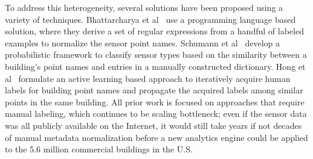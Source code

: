To address this heterogeneity, several solutions have been proposed using a variety of techniques.
Bhattarcharya et al~\cite{arka} use a programming language based solution,
where they derive a set of regular expressions from a handful of labeled examples
to normalize the sensor point names.
Schumann et al~\cite{ibm} develop a probabilistic framework to classify sensor types
based on the similarity between a building's point names and entries in a manually constructed dictionary.
Hong et al~\cite{cikm} formulate an active learning based approach to iteratively
acquire human labels for building point names and propagate the acquired labels among similar points in the same building. All prior work is focused on approaches that require manual labeling, which 
continues to be scaling bottleneck;
even if the sensor data was all publicly available on the Internet, it would still take years if not decades of manual metadata normalization before a new analytics engine could be applied to the 5.6 million commercial buildings in the U.S.


